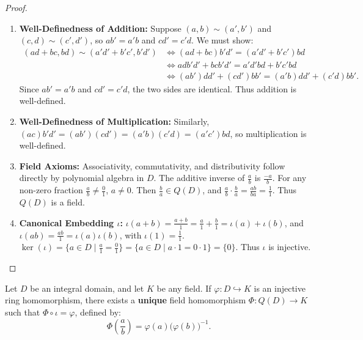 \begin{proof}
\begin{enumerate}[label=\arabic*., leftmargin=*]
    \item \textbf{Well-Definedness of Addition:}
    Suppose $(a, b) \sim (a', b')$ and $(c, d) \sim (c', d')$, so $ab' = a'b$ and $cd' = c'd$.
    We must show:
    \begin{align*}
    (ad + bc, bd) \sim (a'd' + b'c', b'd') 
    &\iff (ad + bc)b'd' = (a'd' + b'c')bd \\
    &\iff adb'd' + bcb'd' = a'd'bd + b'c'bd \\
    &\iff (ab')dd' + (cd')bb' = (a'b)dd' + (c'd)bb'.
    \end{align*}
    Since $ab' = a'b$ and $cd' = c'd$, the two sides are identical. Thus addition is well-defined.

    \item \textbf{Well-Definedness of Multiplication:}
    Similarly, $(ac)b'd' = (ab')(cd') = (a'b)(c'd) = (a'c')bd$, so multiplication is well-defined.

    \item \textbf{Field Axioms:}
    Associativity, commutativity, and distributivity follow directly by polynomial algebra in $D$.
    The additive inverse of $\frac{a}{b}$ is $\frac{-a}{b}$.
    For any non-zero fraction $\frac{a}{b} \ne \frac{0}{1}$, $a \ne 0$.
    Then $\frac{b}{a} \in Q(D)$, and $\frac{a}{b} \cdot \frac{b}{a} = \frac{ab}{ba} = \frac{1}{1}$.
    Thus $Q(D)$ is a field.

    \item \textbf{Canonical Embedding $\iota$:}
    $\iota(a + b) = \frac{a+b}{1} = \frac{a}{1} + \frac{b}{1} = \iota(a) + \iota(b)$, and $\iota(ab) = \frac{ab}{1} = \iota(a)\iota(b)$, with $\iota(1) = \frac{1}{1}$.
    $\ker(\iota) = \{ a \in D \mid \frac{a}{1} = \frac{0}{1} \} = \{ a \in D \mid a \cdot 1 = 0 \cdot 1 \} = \{0\}$.
    Thus $\iota$ is injective.
\end{enumerate}
\end{proof}

\begin{theorem}
\label{thm:universal_frac}
Let $D$ be an integral domain, and let $K$ be any field.
If $\varphi: D \hookrightarrow K$ is an injective ring homomorphism, there exists a \textbf{unique} field homomorphism $\Phi: Q(D) \to K$ such that $\Phi \circ \iota = \varphi$, defined by:
\begin{equation}
\Phi\left(\frac{a}{b}\right) = \varphi(a)\bigl(\varphi(b)\bigr)^{-1}.
\end{equation}
\end{theorem}

